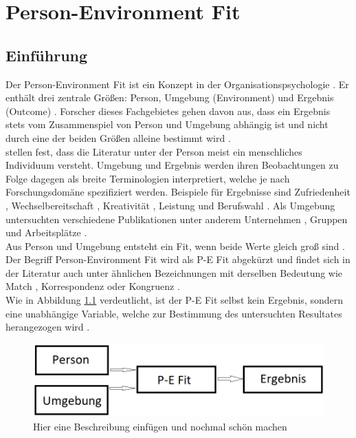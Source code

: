 \chapter{Person-Environment Fit}
\label{ch:personEnvironmentFit}

\section{Einführung}
\label{ch:personEnvironmentFit:einfuehrung}
Der Person-Environment Fit ist ein Konzept in der Organisationspsychologie \cite[S. 1f.]{edwards:2008}. Er enthält drei zentrale Größen: Person, Umgebung (Environment) und Ergebnis (Outcome) \cite[S. 2f.]{livingstone:1997}. Forscher dieses Fachgebietes gehen davon aus, dass ein Ergebnis stets vom Zusammenspiel von Person und Umgebung abhängig ist und nicht durch eine der beiden Größen alleine bestimmt wird \cite[S. 1]{muchinsky:1987}.\\
\textcite[S. 5]{edwards:2007} stellen fest, dass die Literatur unter der Person meist ein menschliches Individuum versteht. Umgebung und Ergebnis werden ihren Beobachtungen zu Folge dagegen als breite Terminologien interpretiert, welche je nach Forschungsdomäne spezifiziert werden. Beispiele für Ergebnisse sind Zufriedenheit \cite[S. 1]{lashani:2021}, Wechselbereitschaft \cite[S. 1]{amarneh:2021}, Kreativität \cite[S. 1]{duan:2019}, Leistung \cite[S. 7f.]{elfenbein:2007} und  Berufswahl \cite[S. 1]{cable:1996}. Als Umgebung untersuchten verschiedene Publikationen unter anderem Unternehmen \cite[S. 1]{kristof:1996}, Gruppen \cite[S. 1]{werbel:2001} und Arbeitsplätze \cite[S. 1]{lu:2014}.\\
Aus Person und Umgebung entsteht ein Fit, wenn beide Werte gleich groß sind \cite[S. 53]{edwards:2008}. Der Begriff Person-Environment Fit wird als P-E Fit abgekürzt \cite[S. 428]{dawis:2002} und findet sich in der Literatur auch unter ähnlichen Bezeichnungen mit derselben Bedeutung wie Match \cite[S. 2]{player:2017}, Korrespondenz \cite[S. 1]{eggerth:2008} oder Kongruenz \cite[S. 1]{muchinsky:1987}.\\
Wie in Abbildung \ref{fig:personEnvironmentFit:einfuehrung:abb1} verdeutlicht, ist der P-E Fit selbst kein Ergebnis, sondern eine unabhängige Variable, welche zur Bestimmung des untersuchten Resultates herangezogen wird \cite[S. 4f.]{edwards:1991}.\\
\begin{figure}[h]
	\centering
	\includegraphics[width=1\textwidth]{gfx/P-E Fit.png}
	\caption{Hier eine Beschreibung einfügen und nochmal schön machen}
	\label{fig:personEnvironmentFit:einfuehrung:abb1}
\end{figure}
